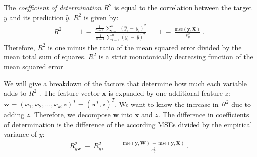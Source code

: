 \documentclass{article}
\newcommand\Bw{\bm{w}}
\newcommand\Bx{\bm{x}}
\newcommand\By{\bm{y}}
\newcommand\BW{\bm{W}}
\newcommand\BX{\bm{X}}
\begin{document}
\begin{appendices}
The {\em coefficient of determination} $R^2$
is equal to the correlation between the target $y$ and
its prediction $\hat{y}$.
$R^2$ is given by:
\begin{align}
 R^2 \ &= \ 1 \ - \ \frac{\frac{1}{n-1}\ \sum_{i=1}^n \left( \hat{y}_i \ - \ y_i
  \right)^2}{\frac{1}{n-1}\ \sum_{i=1}^n \left( y_i \ - \ \bar{y}
  \right)^2} \ = \ 1 \ - \ \frac{\mathrm{mse}(\By,\BX)}{s_y^2}\ . 
\end{align}
Therefore, $R^2$ is one minus the ratio of the mean squared
error divided by the mean total sum of squares.
$R^2$ is a strict monotonically decreasing function of the
mean squared error.


We will give a breakdown of the factors that determine how much
each variable adds to $R^2$ \cite[chapter 10.6, p.~263]{Rencher:08}.
The feature vector $\Bx$ is expanded by one additional feature $z$:
$\Bw=(x_1,x_2,\ldots,x_k,z)^T=(\Bx^T,z)^T$.
We want to know the increase in $R^2$ due to adding $z$.
Therefore, we decompose $\Bw$ into $\Bx$ and $z$.  
The difference in coefficients of determination is the difference 
of the according MSEs divided by the empirical variance of $y$:
\begin{align}
 R^2_{y\Bw} \ - \ R^2_{y\Bx} \ &= \ 
 \frac{\mathrm{mse}(\By,\BW) \ - \ \mathrm{mse}(\By,\BX)}{s_y^2}  \ . 
\end{align}


\end{appendices}
\end{document}
